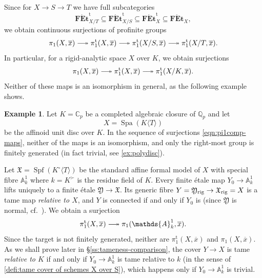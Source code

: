 \documentclass[a4paper,twoside,11pt,reqno]{amsart}
\renewcommand{\mathbb}{\mathds}
\DeclareRobustCommand\longtwoheadrightarrow {\relbar\joinrel\twoheadrightarrow}
\newcommand{\surj}{\longtwoheadrightarrow}
\DeclareMathOperator{\Spf}{Spf}
\DeclareMathOperator{\Spa}{Spa}
\newcommand{\cat}[1]{\mathbf{#1}}
\newcommand{\FEt}{\cat{F\acute{E}t}}
\newcommand{\pitame}{\pi_1^{\mathrm{t}}}
\newcommand{\FEtt}{{\cat{F\acute{E}t}}^{\!\mathrm{t}}}
\theoremstyle{definition}
\newtheorem{ex}[thm]{Example}
\numberwithin{equation}{subsection}
\begin{document}
Since for $X\to S\to T$ we have full subcategories 
\[
    \FEtt_{X/T}\subseteq  \FEtt_{X/S}\subseteq \FEtt_X\subseteq \FEt_X,
\]
we obtain continuous surjections of profinite groups
\[ 
    \pi_1(X, \overline{x}) \surj \pitame(X, \overline{x}) \surj \pitame(X/S,\overline{x}) \surj \pitame(X/T,\overline{x}).
\]
In particular, for a rigid-analytic space $X$ over $K$, we obtain surjections
\begin{equation} \label{eqn:pi1comp-maps}
    \pi_1(X, \overline{x}) \surj \pitame(X,\overline{x}) \surj \pitame(X/K,\overline{x}).
\end{equation}
Neither of these maps is an isomorphism in general, as the following example shows. 

\begin{ex} \label{ex:unit-disc-Cp}
    Let $K = \mathbb{C}_p$ be a completed algebraic closure of $\mathbb{Q}_p$ and let 
    \[ 
        X = \Spa(K\langle T\rangle)
    \]
    be the affinoid unit disc over $K$. In the sequence of surjections \eqref{eqn:pi1comp-maps}, neither of the maps is an isomorphism, and only the right-most group is finitely generated (in fact trivial, see \cref{ex:polydisc}). 
    
    Let $\mathfrak{X} = \Spf(K^\circ \langle T\rangle)$ be the standard affine formal model of $X$ with special fibre $\mathbb{A}^1_k$ where $k=K^\succ$ is the residue field of $K$. Every finite \'etale map $Y_0\to \mathbb{A}^1_k$ lifts uniquely to a finite \'etale $\mathfrak{Y}\to \mathfrak{X}$. Its generic fibre $Y=\mathfrak{Y}_{\rm rig}\to \mathfrak{X}_{\rm rig}=X$ is a tame map \emph{relative to $X$}, and $Y$ is connected if and only if $Y_0$ is (since $\mathfrak{Y}$ is normal, cf.~\cite[Lemma A.2+Corollary A.16]{AchingerLaraYoucis2022}). We obtain a surjection
    \[ 
        \pitame(X,\overline{x}) \surj \pi_1(\mathbb{A}^1_k, \overline{x}).
    \]
    Since the target is not finitely generated, neither are $\pitame(X, \overline{x})$ and $\pi_1(X, \overline{x})$. As we shall prove later in \S\ref{ss:tameness-comparison}, the cover $Y\to X$ is tame \emph{relative to $K$} if and only if $Y_0 \to \mathbb{A}^1_k$ is tame relative to $k$ (in the sense of \cref{defi:tame cover of schemes X over S}), which happens only if $Y_0 \to\mathbb{A}^1_k$ is trivial.


\end{ex}
\end{document}
